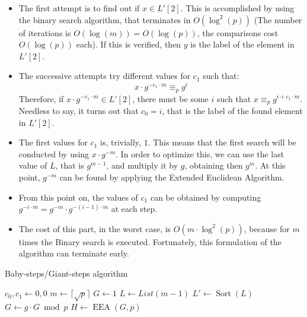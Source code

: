 \begin{itemize}
    \item The first attempt is to find out if $x \in L'[2]$. This is accomplished by using the binary search algorithm, that terminates in $O(\operatorname{log}^{2}(p))$ (The number of iterations is $O(\operatorname{log}(m)) = O(\operatorname{log}(p))$, the comparisons cost $O(\operatorname{log}(p))$ each). If this is verified, then $y$ is the label of the element in $L'[2]$.
    \item The successive attempts try different values for $c_1$ such that:
    \[x \cdot g^{-c_1 \cdot m} \equiv_p g^{i}\]
    Therefore, if $x \cdot g^{-c_1 \cdot m} \in L'[2]$, there must be some $i$ such that $x \equiv_p g^{i + c_1 \cdot m}$. Needless to say, it turns out that $c_0 = i$, that is the label of the found element in $L'[2]$.
    \item The first values for $c_1$ is, trivially, $1$. This means that the first search will be conducted by using $x \cdot g^{-m}$. In order to optimize this, we can use the last value of $L$, that is $g^{m-1}$, and multiply it by $g$, obtaining then $g^m$. At this point, $g^{-m}$ can be found by applying the Extended Euclidean Algorithm.
    \item From this point on, the values of $c_1$ can be obtained by computing $g^{-i \cdot m} = g^{-m} \cdot g^{-(i - 1) \cdot m}$ at each step.
    \item The cost of this part, in the worst case, is $O(m \cdot \operatorname{log}^{2}(p))$, because for $m$ times the Binary search is executed. Fortunately, this formulation of the algorithm can terminate early.
\end{itemize}

\begin{algorithm}
\caption{Baby-steps/Giant-steps algorithm}\label{alg:baby_steps_giant_steps}
    $c_{0}, c_{1} \gets 0, 0$\;
    $m \gets \lceil \sqrt{p} \rceil$\;
    $G \gets 1$\;
    $L \gets List(m - 1)$\;
    $L' \gets \operatorname{Sort}(L)$\;
    $G \gets g \cdot G \bmod p$\;
    $H \gets \operatorname{EEA}(G, p)$\;
\end{algorithm}

